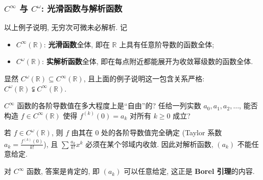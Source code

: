 \begin{frame}
\frametitle{$C^\infty$ 与 $C^\omega$: 光滑函数与解析函数}

以上例子说明, 无穷次可微未必解析. 记
\begin{itemize}
\item $C^\infty(\mathbb{R})$: \textbf{光滑函数}全体, 即在 $\mathbb{R}$ 上具有任意阶导数的函数全体;
\item $C^\omega(\mathbb{R})$: \textbf{实解析函数}全体, 即在每点附近都能展开为收敛幂级数的函数全体.
\end{itemize}
显然 $C^\omega(\mathbb{R}) \subseteq C^\infty(\mathbb{R})$, 且上面的例子说明这一包含关系\alert{严格}: $C^\omega(\mathbb{R}) \subsetneqq C^\infty(\mathbb{R})$.

\pause
\vspace{0.5em}

\begin{question}
$C^\infty$ 函数的各阶导数值在多大程度上是``自由''的? 任给一列实数 $a_0, a_1, a_2, \ldots$, 能否构造 $f \in C^\infty(\mathbb{R})$ 使得 $f^{(k)}(0) = a_k$ 对所有 $k \geqslant 0$ 成立?
\end{question}

\pause
\vspace{0.5em}

若 $f \in C^\omega(\mathbb{R})$, 则 $f$ 由其在 $0$ 处的各阶导数值完全确定 (Taylor 系数 $a_k = \frac{f^{(k)}(0)}{k!}$), 且 $\sum \frac{a_k}{k!} x^k$ 必须在某个邻域内收敛. 因此对解析函数, $(a_k)$ \alert{不能任意给定}.

\pause
\vspace{0.5em}

对 $C^\infty$ 函数, \alert{答案是肯定的}, 即 $(a_k)$ 可以任意给定, 这正是 \textbf{Borel 引理}的内容.

\end{frame}


